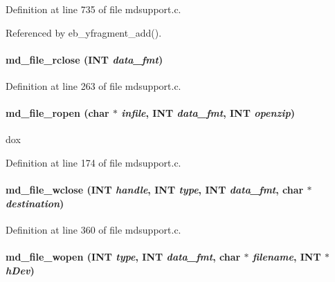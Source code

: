 Definition at line 735 of file mdsupport.c.

Referenced by eb\_\-yfragment\_\-add().
\paragraph[{md\_\-file\_\-rclose}]{ md\_\-file\_\-rclose ({\bf INT} {\em data\_\-fmt})}\hfill\label{group__mdsupportincludecode_gaf603b6116517a699875a2ebe243346d7}


Definition at line 263 of file mdsupport.c.
\paragraph[{md\_\-file\_\-ropen}]{ md\_\-file\_\-ropen (char $\ast$ {\em infile}, \/  {\bf INT} {\em data\_\-fmt}, \/  {\bf INT} {\em openzip})}\hfill\label{group__mdsupportincludecode_ga133a44577a83b8b79a5fe481b3664101}
dox 

Definition at line 174 of file mdsupport.c.
\paragraph[{md\_\-file\_\-wclose}]{ md\_\-file\_\-wclose ({\bf INT} {\em handle}, \/  {\bf INT} {\em type}, \/  {\bf INT} {\em data\_\-fmt}, \/  char $\ast$ {\em destination})}\hfill\label{group__mdsupportincludecode_ga032398db09f238c92ebb1a7ee32aa35d}


Definition at line 360 of file mdsupport.c.
\paragraph[{md\_\-file\_\-wopen}]{ md\_\-file\_\-wopen ({\bf INT} {\em type}, \/  {\bf INT} {\em data\_\-fmt}, \/  char $\ast$ {\em filename}, \/  {\bf INT} $\ast$ {\em hDev})}\hfill\label{group__mdsupportincludecode_ga0ef456e28aa29f49dfac802fc7364508}


